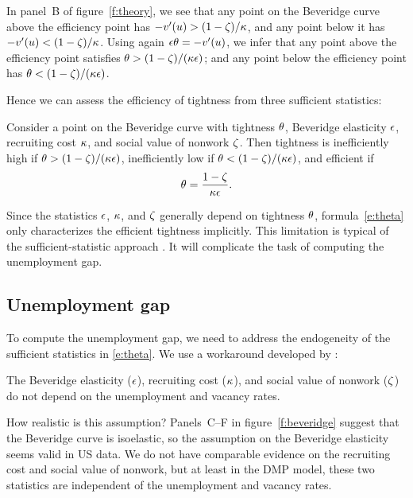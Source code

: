 \documentclass[letterpaper,12pt,leqno]{article}
\begin{document}
In panel~B of figure~\ref{f:theory}, we see that any point on the Beveridge curve above the efficiency point has $- v'(u) > (1-\zeta)/\kappa$, and any point below it has $- v'(u) < (1-\zeta)/\kappa$. Using again $\epsilon\theta = - v'(u)$, we infer that any point above the efficiency point satisfies $\theta> (1-\zeta)/(\kappa\epsilon)$; and any point below the efficiency point has $\theta < (1-\zeta)/(\kappa\epsilon)$.

Hence we can assess the efficiency of tightness from three sufficient statistics:

\begin{proposition}\label{p:theta} Consider a point on the Beveridge curve with tightness $\theta$, Beveridge elasticity $\epsilon$, recruiting cost $\kappa$, and social value of nonwork $\zeta$. Then tightness is inefficiently high if $\theta > (1-\zeta)/(\kappa\epsilon)$,  inefficiently low if $\theta < (1-\zeta)/(\kappa\epsilon)$, and efficient if 
\begin{equation}
\theta = \frac{1-\zeta}{\kappa \epsilon}.
\label{e:theta}\end{equation}\end{proposition}

Since the statistics $\epsilon$, $\kappa$, and $\zeta$  generally depend on tightness $\theta$, formula~\eqref{e:theta} only characterizes the efficient tightness implicitly. This limitation is typical of the sufficient-statistic approach . It will complicate the task of computing the unemployment gap. 

\subsection{Unemployment gap}

To compute the unemployment gap, we need to address the endogeneity of the sufficient statistics in \eqref{e:theta}. We use a workaround developed by :

\begin{assumption}\label{a:constant} The Beveridge elasticity ($\epsilon$), recruiting cost ($\kappa$), and social value of nonwork ($\zeta$) do not depend on the unemployment and vacancy rates.\end{assumption}

How realistic is this assumption? Panels~C--F in figure~\ref{f:beveridge} suggest that the Beveridge curve is isoelastic, so the assumption on the Beveridge elasticity seems valid in US data. We do not have comparable evidence on the recruiting cost and social value of nonwork, but at least in the DMP model, these two statistics are independent of the unemployment and vacancy rates.
\end{document}
